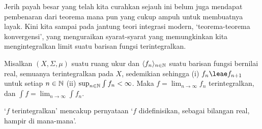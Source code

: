 
\def\chaptername{Integrasi}
\def\sectionname{Teorema-teorema konvergensi}


Jerih payah besar yang telah kita curahkan sejauh ini belum juga mendapat
pembenaran dari teorema mana pun yang cukup ampuh untuk membuatnya layak. Kini kita
sampai pada jantung teori integrasi modern, `teorema-teorema
konvergensi', yang menguraikan syarat-syarat yang memungkinkan kita
mengintegralkan limit suatu barisan fungsi terintegralkan.

 Misalkan $(X,\Sigma,\mu)$ suatu ruang ukur
dan $\langle f_n\rangle_{n\in\Bbb N}$ suatu barisan fungsi bernilai
real, semuanya terintegralkan pada $X$, sedemikian sehingga (i)
$f_n\leae f_{n+1}$ untuk setiap $n\in\Bbb N$ (ii)
$\sup_{n\in\Bbb N}\int f_n<\infty$. Maka
$f=\lim_{n\to\infty}f_n$ terintegralkan, dan
$\int f=\lim_{n\to\infty}\int f_n$.

\medskip

 
`$f$ terintegralkan' mencakup pernyataan `$f$ didefinisikan, sebagai
bilangan real, hampir di mana-mana'.

